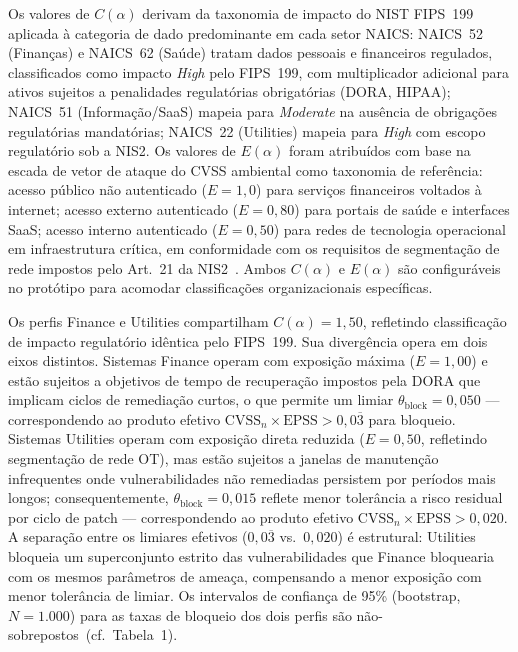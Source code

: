 
Os valores de $C(\alpha)$ derivam da taxonomia de impacto do NIST FIPS~199
aplicada à categoria de dado predominante em cada setor NAICS: NAICS~52
(Finanças) e NAICS~62 (Saúde) tratam dados pessoais e financeiros regulados,
classificados como impacto \emph{High} pelo FIPS~199, com multiplicador
adicional para ativos sujeitos a penalidades regulatórias obrigatórias (DORA,
HIPAA); NAICS~51 (Informação/SaaS) mapeia para \emph{Moderate} na ausência
de obrigações regulatórias mandatórias; NAICS~22 (Utilities) mapeia para
\emph{High} com escopo regulatório sob a NIS2. Os valores de $E(\alpha)$
foram atribuídos com base na escada de vetor de ataque do CVSS ambiental
como taxonomia de referência: acesso público não autenticado ($E = 1{,}0$)
para serviços financeiros voltados à internet; acesso externo autenticado
($E = 0{,}80$) para portais de saúde e interfaces SaaS; acesso interno
autenticado ($E = 0{,}50$) para redes de tecnologia operacional em
infraestrutura crítica, em conformidade com os requisitos de segmentação de
rede impostos pelo Art.~21 da NIS2~\cite{nis2directive}. Ambos $C(\alpha)$ e
$E(\alpha)$ são configuráveis no protótipo para acomodar classificações
organizacionais específicas.



Os perfis Finance e Utilities compartilham $C(\alpha) = 1{,}50$, refletindo
classificação de impacto regulatório idêntica pelo FIPS~199. Sua divergência
opera em dois eixos distintos. Sistemas Finance operam com exposição máxima
($E = 1{,}00$) e estão sujeitos a objetivos de tempo de recuperação impostos
pela DORA que implicam ciclos de remediação curtos, o que permite um limiar
$\theta_{\text{block}} = 0{,}050$ — correspondendo ao produto efetivo
$\text{CVSS}_n \times \text{EPSS} > 0{,}0\overline{3}$ para bloqueio.
Sistemas Utilities operam com exposição direta reduzida ($E = 0{,}50$,
refletindo segmentação de rede OT), mas estão sujeitos a janelas de
manutenção infrequentes onde vulnerabilidades não remediadas persistem por
períodos mais longos; consequentemente, $\theta_{\text{block}} = 0{,}015$
reflete menor tolerância a risco residual por ciclo de patch — correspondendo
ao produto efetivo $\text{CVSS}_n \times \text{EPSS} > 0{,}020$. A separação
entre os limiares efetivos ($0{,}0\overline{3}$ vs.\ $0{,}020$) é estrutural:
Utilities bloqueia um superconjunto estrito das vulnerabilidades que Finance
bloquearia com os mesmos parâmetros de ameaça, compensando a menor exposição
com menor tolerância de limiar. Os intervalos de confiança de 95\% (bootstrap,
$N = 1{.}000$) para as taxas de bloqueio dos dois perfis são
não-sobrepostos~(cf.\ Tabela~1).


